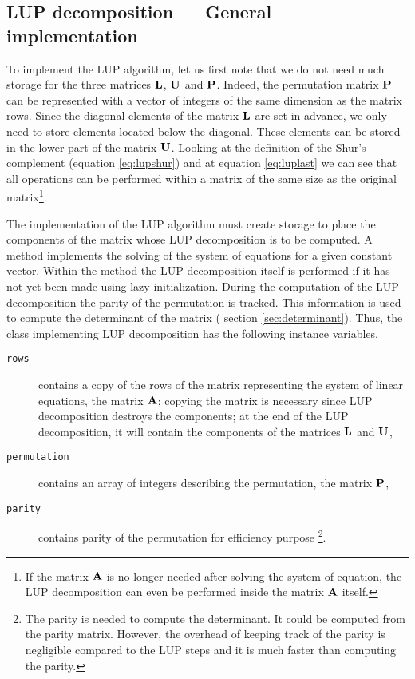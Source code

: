 \documentclass[twoside]{book}
\begin{document}
\subsection{LUP decomposition --- General implementation}
 To implement the LUP algorithm, let us
first note that we do not need much storage for the three matrices
${\bf L}$, ${\bf U}$ and ${\bf P}$. Indeed, the permutation matrix
${\bf P}$ can be represented with a vector of integers of the same
dimension as the matrix rows. Since the diagonal elements of the
matrix ${\bf L}$ are set in advance, we only need to store
elements located below the diagonal. These elements can be stored
in the lower part of the matrix ${\bf U}$. Looking at the
definition of the Shur's complement (equation \ref{eq:lupshur})
and at equation \ref{eq:luplast} we can see that all operations
can be performed within a matrix of the same size as the original
matrix\footnote{If the matrix ${\bf A}$ is no longer needed after
solving the system of equation, the LUP decomposition can even be
performed inside the matrix ${\bf A}$ itself.}.

The implementation of the LUP algorithm must create storage to
place the components of the matrix whose LUP decomposition is to
be computed. A method implements the solving of the system of
equations for a given constant vector. Within the method the LUP
decomposition itself is performed if it has not yet been made
using lazy initialization. During the computation of the LUP
decomposition the parity of the permutation is tracked. This
information is used to compute the determinant of the matrix (\cf
section \ref{sec:determinant}). Thus, the class implementing LUP
decomposition has the following instance variables.
\begin{description}
\item[\tt rows]contains a copy of the rows of the matrix
representing the system of linear equations, \ie the matrix ${\bf
A}$; copying the matrix is necessary since LUP decomposition
destroys the components; at the end of the LUP decomposition, it
will contain the components of the matrices ${\bf L}$ and ${\bf
U}$,
\item[\tt permutation]contains an array of integers describing the permutation,
\ie the matrix ${\bf P}$,
\item[\tt parity]contains parity of the permutation for efficiency purpose
\footnote{The parity is needed to compute the determinant. It
could be computed from the parity matrix. However, the overhead of
keeping track of the parity is negligible compared to the LUP
steps and it is much faster than computing the parity.}.
\end{description}
\end{document}
